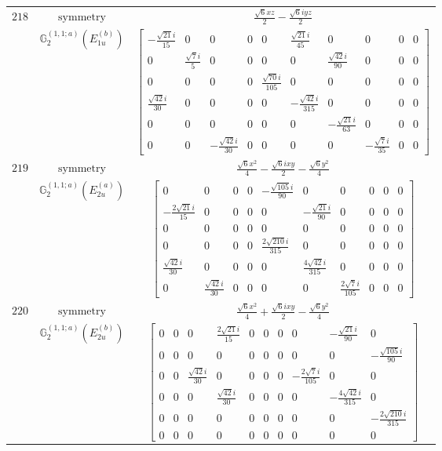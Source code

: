\documentclass[fleqn,8pt,landscape]{jsarticle}
\begin{document}
\begin{longtable}{ccc}
$ 218 $ & $ \text{symmetry} $ & $ \frac{\sqrt{6} x z}{2} - \frac{\sqrt{6} i y z}{2} $ \\
$  $ & $ \mathbb{G}_{2}^{(1,1;a)}(E_{1u}^{(b)}) $ & $ \begin{bmatrix} - \frac{\sqrt{21} i}{15} & 0 & 0 & 0 & 0 & \frac{\sqrt{21} i}{45} & 0 & 0 & 0 & 0 \\ 0 & \frac{\sqrt{7} i}{5} & 0 & 0 & 0 & 0 & \frac{\sqrt{42} i}{90} & 0 & 0 & 0 \\ 0 & 0 & 0 & 0 & \frac{\sqrt{70} i}{105} & 0 & 0 & 0 & 0 & 0 \\ \frac{\sqrt{42} i}{30} & 0 & 0 & 0 & 0 & - \frac{\sqrt{42} i}{315} & 0 & 0 & 0 & 0 \\ 0 & 0 & 0 & 0 & 0 & 0 & - \frac{\sqrt{21} i}{63} & 0 & 0 & 0 \\ 0 & 0 & - \frac{\sqrt{42} i}{30} & 0 & 0 & 0 & 0 & - \frac{\sqrt{7} i}{35} & 0 & 0 \end{bmatrix} $ \\ \hline
$ 219 $ & $ \text{symmetry} $ & $ \frac{\sqrt{6} x^{2}}{4} - \frac{\sqrt{6} i x y}{2} - \frac{\sqrt{6} y^{2}}{4} $ \\
$  $ & $ \mathbb{G}_{2}^{(1,1;a)}(E_{2u}^{(a)}) $ & $ \begin{bmatrix} 0 & 0 & 0 & 0 & - \frac{\sqrt{105} i}{90} & 0 & 0 & 0 & 0 & 0 \\ - \frac{2 \sqrt{21} i}{15} & 0 & 0 & 0 & 0 & - \frac{\sqrt{21} i}{90} & 0 & 0 & 0 & 0 \\ 0 & 0 & 0 & 0 & 0 & 0 & 0 & 0 & 0 & 0 \\ 0 & 0 & 0 & 0 & \frac{2 \sqrt{210} i}{315} & 0 & 0 & 0 & 0 & 0 \\ \frac{\sqrt{42} i}{30} & 0 & 0 & 0 & 0 & \frac{4 \sqrt{42} i}{315} & 0 & 0 & 0 & 0 \\ 0 & \frac{\sqrt{42} i}{30} & 0 & 0 & 0 & 0 & \frac{2 \sqrt{7} i}{105} & 0 & 0 & 0 \end{bmatrix} $ \\ \hline
$ 220 $ & $ \text{symmetry} $ & $ \frac{\sqrt{6} x^{2}}{4} + \frac{\sqrt{6} i x y}{2} - \frac{\sqrt{6} y^{2}}{4} $ \\
$  $ & $ \mathbb{G}_{2}^{(1,1;a)}(E_{2u}^{(b)}) $ & $ \begin{bmatrix} 0 & 0 & 0 & \frac{2 \sqrt{21} i}{15} & 0 & 0 & 0 & 0 & - \frac{\sqrt{21} i}{90} & 0 \\ 0 & 0 & 0 & 0 & 0 & 0 & 0 & 0 & 0 & - \frac{\sqrt{105} i}{90} \\ 0 & 0 & \frac{\sqrt{42} i}{30} & 0 & 0 & 0 & 0 & - \frac{2 \sqrt{7} i}{105} & 0 & 0 \\ 0 & 0 & 0 & \frac{\sqrt{42} i}{30} & 0 & 0 & 0 & 0 & - \frac{4 \sqrt{42} i}{315} & 0 \\ 0 & 0 & 0 & 0 & 0 & 0 & 0 & 0 & 0 & - \frac{2 \sqrt{210} i}{315} \\ 0 & 0 & 0 & 0 & 0 & 0 & 0 & 0 & 0 & 0 \end{bmatrix} $ \\ \hline

\end{longtable}
\end{document}
